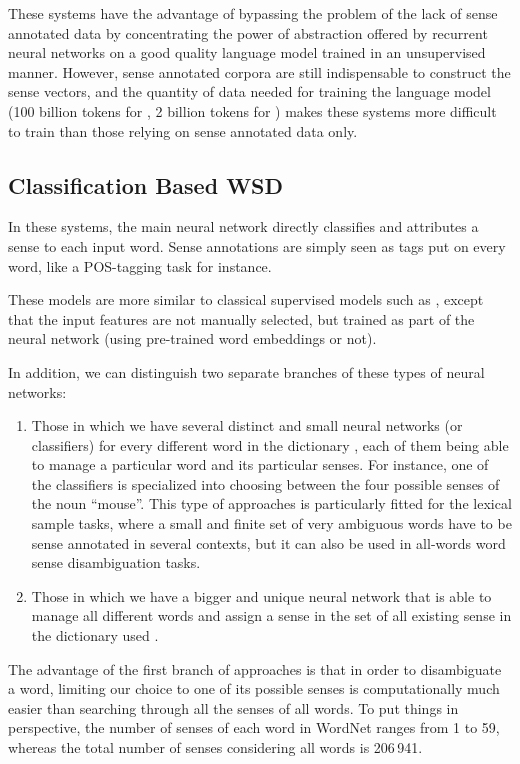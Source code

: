 \documentclass[11pt,a4paper]{article}
\begin{document}
These systems have the advantage of bypassing the problem of the lack of sense annotated data by concentrating the power of abstraction offered by recurrent neural networks on a good quality language model trained in an unsupervised manner.
However, sense annotated corpora are still indispensable to construct the sense vectors, and the quantity of data needed for training the language model (100 billion tokens for \citet{yuan_2016}, 2 billion tokens for \citet{minh2018}) makes these systems more difficult to train than those relying on sense annotated data only. 


\subsection{Classification Based WSD}\label{sec:classif_based_wsd}

In these systems, the main neural network directly classifies and attributes a sense to each input word. Sense annotations are simply seen as tags put on every word, like a POS-tagging task for instance.

These models are more similar to classical supervised models such as \citet{Chan2007}, except that the input features are not manually selected, but trained as part of the neural network (using pre-trained word embeddings or not).


In addition, we can distinguish two separate branches of these types of neural networks: 
\begin{enumerate}[leftmargin=*]
    \item Those in which we have several distinct and small neural networks (or classifiers) for every different word in the dictionary \citep{iacobacci2016embeddings,kaageback2016word}, each of them being able to manage a particular word and its particular senses. For instance, one of the classifiers is specialized into choosing between the four possible senses of the noun ``mouse''. This type of approaches is particularly fitted for the lexical sample tasks, where a small and finite set of very ambiguous words have to be sense annotated in several contexts, but it can also be used in all-words word sense disambiguation tasks.
    \item Those in which we have a bigger and unique neural network that is able to manage all different words and assign a sense in the set of all existing sense in the dictionary used \citep{raganato2017}.
\end{enumerate}

The advantage of the first branch of approaches is that in order to disambiguate a word, limiting our choice to one of its possible senses is computationally much easier than searching through all the senses of all words. To put things in perspective, the number of senses of each word in WordNet ranges from 1 to 59,
whereas the total number of senses considering all words is 206\,941. 
\end{document}
